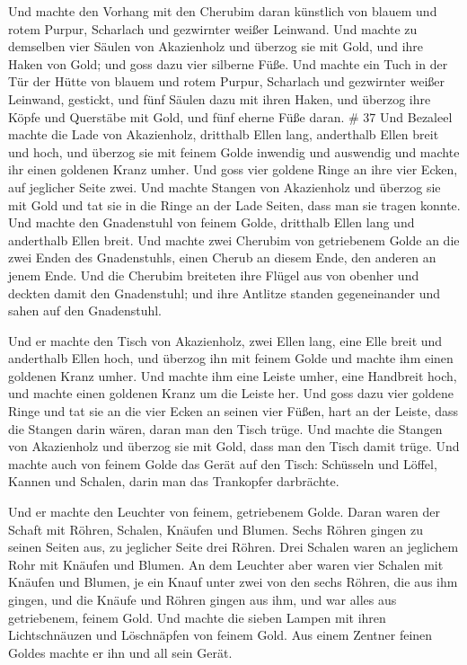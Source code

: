  Und machte den Vorhang mit den Cherubim daran künstlich
von blauem und rotem Purpur, Scharlach und gezwirnter weißer Leinwand.
 Und machte zu demselben vier Säulen von Akazienholz und
überzog sie mit Gold, und ihre Haken von Gold; und goss dazu vier
silberne Füße.  Und machte ein Tuch in der Tür der Hütte
von blauem und rotem Purpur, Scharlach und gezwirnter weißer Leinwand,
gestickt,  und fünf Säulen dazu mit ihren Haken, und
überzog ihre Köpfe und Querstäbe mit Gold, und fünf eherne Füße daran.
\# 37  Und Bezaleel machte die Lade von Akazienholz,
dritthalb Ellen lang, anderthalb Ellen breit und hoch,  und
überzog sie mit feinem Golde inwendig und auswendig und machte ihr einen
goldenen Kranz umher.  Und goss vier goldene Ringe an ihre
vier Ecken, auf jeglicher Seite zwei.  Und machte Stangen
von Akazienholz und überzog sie mit Gold  und tat sie in die
Ringe an der Lade Seiten, dass man sie tragen konnte.  Und
machte den Gnadenstuhl von feinem Golde, dritthalb Ellen lang und
anderthalb Ellen breit.  Und machte zwei Cherubim von
getriebenem Golde an die zwei Enden des Gnadenstuhls,  einen
Cherub an diesem Ende, den anderen an jenem Ende.  Und die
Cherubim breiteten ihre Flügel aus von obenher und deckten damit den
Gnadenstuhl; und ihre Antlitze standen gegeneinander und sahen auf den
Gnadenstuhl.

 Und er machte den Tisch von Akazienholz, zwei Ellen lang,
eine Elle breit und anderthalb Ellen hoch,  und überzog ihn
mit feinem Golde und machte ihm einen goldenen Kranz umher.
 Und machte ihm eine Leiste umher, eine Handbreit hoch, und
machte einen goldenen Kranz um die Leiste her.  Und goss
dazu vier goldene Ringe und tat sie an die vier Ecken an seinen vier
Füßen,  hart an der Leiste, dass die Stangen darin wären,
daran man den Tisch trüge.  Und machte die Stangen von
Akazienholz und überzog sie mit Gold, dass man den Tisch damit trüge.
 Und machte auch von feinem Golde das Gerät auf den Tisch:
Schüsseln und Löffel, Kannen und Schalen, darin man das Trankopfer
darbrächte.

 Und er machte den Leuchter von feinem, getriebenem Golde.
Daran waren der Schaft mit Röhren, Schalen, Knäufen und Blumen.
 Sechs Röhren gingen zu seinen Seiten aus, zu jeglicher
Seite drei Röhren.  Drei Schalen waren an jeglichem Rohr
mit Knäufen und Blumen.  An dem Leuchter aber waren vier
Schalen mit Knäufen und Blumen,  je ein Knauf unter zwei
von den sechs Röhren, die aus ihm gingen,  und die Knäufe
und Röhren gingen aus ihm, und war alles aus getriebenem, feinem Gold.
 Und machte die sieben Lampen mit ihren Lichtschnäuzen und
Löschnäpfen von feinem Gold.  Aus einem Zentner feinen
Goldes machte er ihn und all sein Gerät.

